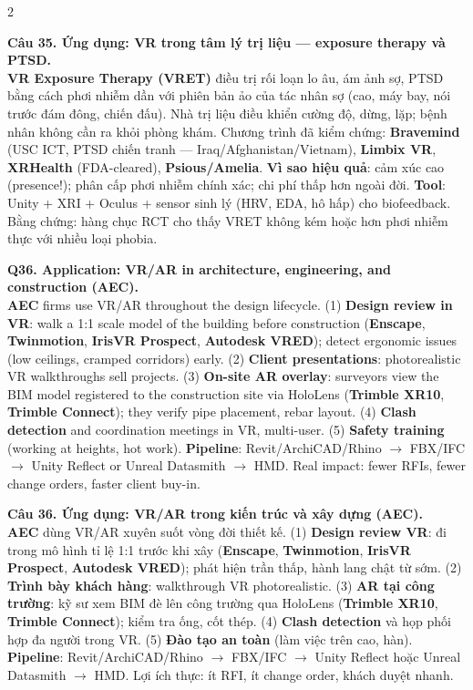 \begin{paracol}{2}
\switchcolumn

\textbf{Câu 35. Ứng dụng: VR trong tâm lý trị liệu --- exposure therapy và PTSD.}\\
\textbf{VR Exposure Therapy (VRET)} điều trị rối loạn lo âu, ám ảnh sợ, PTSD bằng cách phơi nhiễm dần với phiên bản ảo của tác nhân sợ (cao, máy bay, nói trước đám đông, chiến đấu). Nhà trị liệu điều khiển cường độ, dừng, lặp; bệnh nhân không cần ra khỏi phòng khám. Chương trình đã kiểm chứng: \textbf{Bravemind} (USC ICT, PTSD chiến tranh --- Iraq/Afghanistan/Vietnam), \textbf{Limbix VR}, \textbf{XRHealth} (FDA-cleared), \textbf{Psious/Amelia}. \textbf{Vì sao hiệu quả}: cảm xúc cao (presence!); phân cấp phơi nhiễm chính xác; chi phí thấp hơn ngoài đời. \textbf{Tool}: Unity + XRI + Oculus + sensor sinh lý (HRV, EDA, hô hấp) cho biofeedback. Bằng chứng: hàng chục RCT cho thấy VRET không kém hoặc hơn phơi nhiễm thực với nhiều loại phobia.

\switchcolumn*

\textbf{Q36. Application: VR/AR in architecture, engineering, and construction (AEC).}\\
\textbf{AEC} firms use VR/AR throughout the design lifecycle. (1) \textbf{Design review in VR}: walk a 1:1 scale model of the building before construction (\textbf{Enscape}, \textbf{Twinmotion}, \textbf{IrisVR Prospect}, \textbf{Autodesk VRED}); detect ergonomic issues (low ceilings, cramped corridors) early. (2) \textbf{Client presentations}: photorealistic VR walkthroughs sell projects. (3) \textbf{On-site AR overlay}: surveyors view the BIM model registered to the construction site via HoloLens (\textbf{Trimble XR10}, \textbf{Trimble Connect}); they verify pipe placement, rebar layout. (4) \textbf{Clash detection} and coordination meetings in VR, multi-user. (5) \textbf{Safety training} (working at heights, hot work). \textbf{Pipeline}: Revit/ArchiCAD/Rhino $\to$ FBX/IFC $\to$ Unity Reflect or Unreal Datasmith $\to$ HMD. Real impact: fewer RFIs, fewer change orders, faster client buy-in.

\switchcolumn

\textbf{Câu 36. Ứng dụng: VR/AR trong kiến trúc và xây dựng (AEC).}\\
\textbf{AEC} dùng VR/AR xuyên suốt vòng đời thiết kế. (1) \textbf{Design review VR}: đi trong mô hình tỉ lệ 1:1 trước khi xây (\textbf{Enscape}, \textbf{Twinmotion}, \textbf{IrisVR Prospect}, \textbf{Autodesk VRED}); phát hiện trần thấp, hành lang chật từ sớm. (2) \textbf{Trình bày khách hàng}: walkthrough VR photorealistic. (3) \textbf{AR tại công trường}: kỹ sư xem BIM đè lên công trường qua HoloLens (\textbf{Trimble XR10}, \textbf{Trimble Connect}); kiểm tra ống, cốt thép. (4) \textbf{Clash detection} và họp phối hợp đa người trong VR. (5) \textbf{Đào tạo an toàn} (làm việc trên cao, hàn). \textbf{Pipeline}: Revit/ArchiCAD/Rhino $\to$ FBX/IFC $\to$ Unity Reflect hoặc Unreal Datasmith $\to$ HMD. Lợi ích thực: ít RFI, ít change order, khách duyệt nhanh.


\end{paracol}
